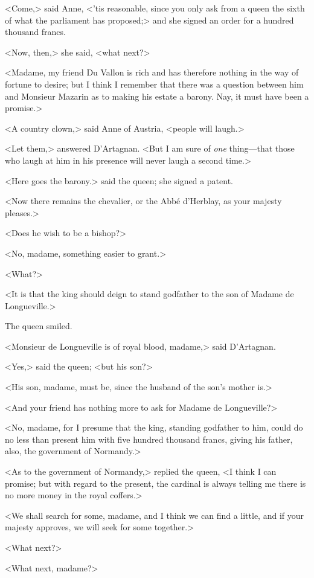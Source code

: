 <Come,> said Anne, <'tis reasonable, since you only ask from a queen the sixth of what the parliament has proposed;> and she signed an order for a hundred thousand francs.

<Now, then,> she said, <what next?>

<Madame, my friend Du Vallon is rich and has therefore nothing in the way of fortune to desire; but I think I remember that there was a question between him and Monsieur Mazarin as to making his estate a barony. Nay, it must have been a promise.>

<A country clown,> said Anne of Austria, <people will laugh.>

<Let them,> answered D'Artagnan. <But I am sure of \emph{one} thing—that those who laugh at him in his presence will never laugh a second time.>

<Here goes the barony.> said the queen; she signed a patent.

<Now there remains the chevalier, or the Abbé d'Herblay, as your majesty pleases.>

<Does he wish to be a bishop?>

<No, madame, something easier to grant.>

<What?>

<It is that the king should deign to stand godfather to the son of Madame de Longueville.>

The queen smiled.

<Monsieur de Longueville is of royal blood, madame,> said D'Artagnan.

<Yes,> said the queen; <but his son?>

<His son, madame, must be, since the husband of the son's mother is.>

<And your friend has nothing more to ask for Madame de Longueville?>

<No, madame, for I presume that the king, standing godfather to him, could do no less than present him with five hundred thousand francs, giving his father, also, the government of Normandy.>

<As to the government of Normandy,> replied the queen, <I think I can promise; but with regard to the present, the cardinal is always telling me there is no more money in the royal coffers.>

<We shall search for some, madame, and I think we can find a little, and if your majesty approves, we will seek for some together.>

<What next?>

<What next, madame?>

